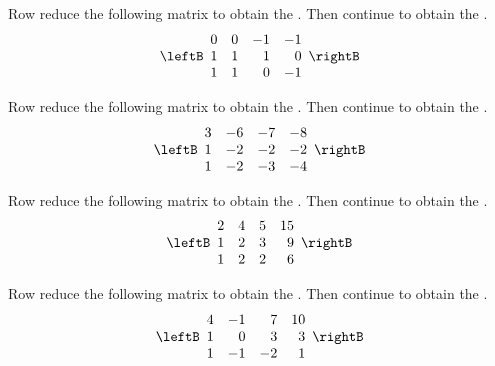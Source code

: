 \begin{enumialphparenastyle}
\begin{ex} Row reduce the following matrix to obtain the \ef. Then continue to obtain the \rref. 
\begin{equation*}
\leftB
\begin{array}{rrrr}
0 & 0 & -1 & -1 \\
1 & 1 & 1 & 0 \\
1 & 1 & 0 & -1
\end{array}
\rightB
\end{equation*}
\end{ex}

\begin{ex} Row reduce the following matrix to obtain the \ef. Then continue to obtain the \rref. 
\begin{equation*}
\leftB
\begin{array}{rrrr}
3 & -6 & -7 & -8 \\
1 & -2 & -2 & -2 \\
1 & -2 & -3 & -4
\end{array}
\rightB
\end{equation*}
\end{ex}

\begin{ex} Row reduce the following matrix to obtain the \ef. Then continue to obtain the \rref. 
\begin{equation*}
\leftB
\begin{array}{rrrr}
2 & 4 & 5 & 15 \\
1 & 2 & 3 & 9 \\
1 & 2 & 2 & 6
\end{array}
\rightB
\end{equation*}
\end{ex}

\begin{ex} Row reduce the following matrix to obtain the \ef. Then continue to obtain the \rref. 
\begin{equation*}
\leftB
\begin{array}{rrrr}
4 & -1 & 7 & 10 \\
1 & 0 & 3 & 3 \\
1 & -1 & -2 & 1
\end{array}
\rightB
\end{equation*}
\end{ex}


\end{enumialphparenastyle}
